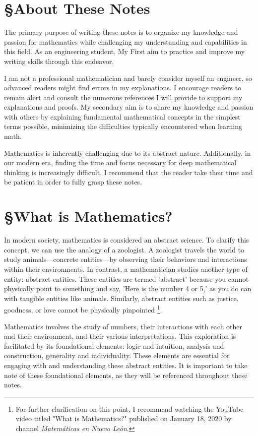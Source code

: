 \section{\S About These Notes}
The primary purpose of writing these notes is to organize my knowledge and passion for mathematics while challenging my understanding and capabilities in this field. As an engineering student, My First aim to practice and improve my  writing skills through this endeavor.

I am not a professional mathematician and barely consider myself an engineer, so advanced readers might find errors in my explanations. I encourage readers to remain alert and consult the numerous references I will provide to support my explanations and proofs. My secondary aim is to share my knowledge and passion with others by explaining fundamental mathematical concepts in the simplest terms possible, minimizing the difficulties typically encountered when learning math.

Mathematics is inherently challenging due to its abstract nature. Additionally, in our modern era, finding the time and focus necessary for deep mathematical thinking is increasingly difficult. I recommend that the reader take their time and be patient in order to fully grasp these notes.

\section{\S What is Mathematics?}
In modern society, mathematics is considered an abstract science. To clarify this concept, we can use the analogy of a zoologist. A zoologist travels the world to study animals—concrete entities—by observing their behaviors and interactions within their environments. In contrast, a mathematician studies another type of entity: abstract entities. These entities are termed 'abstract' because you cannot physically point to something and say, 'Here is the number 4 or 5,' as you do can with tangible entities like animals. Similarly, abstract entities such as justice, goodness, or love cannot be physically pinpointed
\footnote{For further clarification on this point, I recommend watching the YouTube video titled "What is Mathematics?" published on January 18, 2020 by channel \textit{Matemáticas en Nuevo León}.}.

Mathematics involves the study of numbers, their interactions with each other and their environment, and their various interpretations. This exploration is facilitated by its foundational elements: logic and intuition, analysis and construction, generality and individuality. These elements are essential for engaging with and understanding these abstract entities. It is important to take note of these foundational elements, as they will be referenced throughout these notes.

